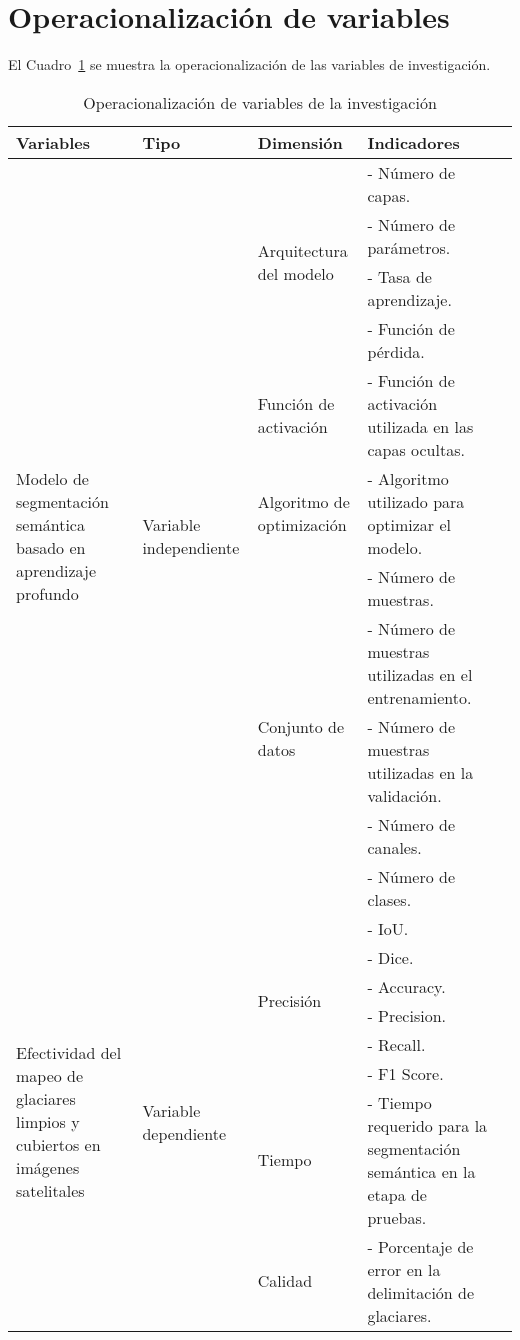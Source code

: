 \section{Operacionalización de variables}
\label{sec:OperacionalizacionVariables}

El Cuadro~\ref{tab:OperacionalizacionVariables} se muestra la operacionalización de las variables de investigación.

\begin{landscape}
\begin{table}
\caption{Operacionalización de variables de la investigación}
\footnotesize
\begin{tabularx}{\linewidth}{@{} *5{X} @{}}
\hline
\textbf{Variables} & \textbf{Tipo} & \textbf{Dimensión} & \textbf{Indicadores} \\ \hline
\multirow{11}{=}{\parbox{4cm}{Modelo de segmentación semántica basado en aprendizaje profundo}} & \multirow{11}{=}{\parbox{4cm}{Variable independiente}} & \multirow{4}{=}{\parbox{4cm}{Arquitectura del modelo}} & - Número de capas. \\ &  &  & - Número de parámetros. \\
 &  &  & - Tasa de aprendizaje. \\
 &  &  & - Función de pérdida. \\ \cline{3-4}
 &  & Función de activación & - Función de activación utilizada en las capas ocultas. \\ \cline{3-4}
 &  & Algoritmo de optimización & - Algoritmo utilizado para optimizar el modelo. \\ \cline{3-4}
 &  & \multirow{5}{*}{Conjunto de datos} & - Número de muestras. \\
 &  &  & - Número de muestras utilizadas en el entrenamiento. \\
 &  &  & - Número de muestras utilizadas en la validación. \\
 &  &  & - Número de canales. \\
 &  &  & - Número de clases. \\ \hline
\multirow{8}{=}{\parbox{4cm}{Efectividad del mapeo de glaciares limpios y cubiertos en imágenes satelitales}} & \multirow{8}{=}{\parbox{4cm}{Variable dependiente}} & \multirow{6}{=}{\parbox{4cm}{Precisión}} & - IoU. \\
 &  &  & - Dice. \\
 &  &  & - Accuracy. \\
 &  &  & - Precision. \\
 &  &  & - Recall. \\
 &  &  & - F1 Score. \\ \cline{3-4} 
 &  & Tiempo & - Tiempo requerido para la segmentación semántica en la etapa de pruebas. \\ \cline{3-4}
 &  & Calidad & - Porcentaje de error en la delimitación de glaciares. \\ \hline
\end{tabularx}
\begin{minipage}{\textwidth}
    \vspace{10pt}
    \label{tab:OperacionalizacionVariables}
\end{minipage}
\end{table}
\end{landscape}
